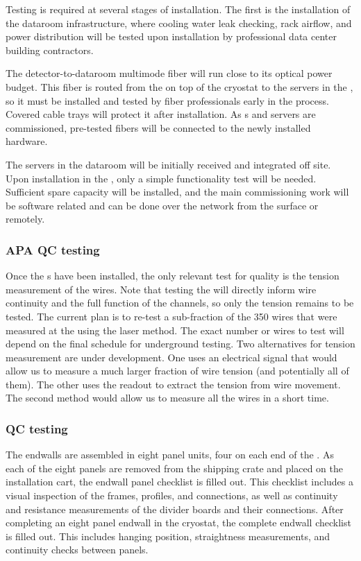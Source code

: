 Testing is required at several stages of  installation.  The first is the installation of the dataroom infrastructure, where cooling water leak checking, rack airflow, and power distribution will be tested upon installation by professional data center building contractors.

The detector-to-dataroom multimode fiber will run close to its optical power budget.  This fiber is routed from the  on top of the cryostat to the servers in the , so it must be installed and tested by fiber professionals early in the process.  Covered cable trays will protect it after installation.  As s and servers are commissioned, pre-tested fibers will be connected to the newly installed hardware.

The  servers in the  dataroom will be initially received and integrated off site.  Upon installation in the , only a simple functionality test will be needed.  Sufficient spare capacity will be installed, and the main commissioning work will be software related and can be done over the network from the surface or remotely.

\subsubsection{APA QC testing}

Once the s have been installed, the only relevant test for  quality is the tension measurement of the wires. 
Note that testing the  will directly inform wire continuity and the full function of the channels, so only the tension remains to be tested. 
The current plan is to re-test a sub-fraction of the 350 wires that were measured at the  using the laser method. 
The exact number or wires to test will depend on the final schedule for underground testing. 
Two alternatives for tension measurement are under development. 
One uses an electrical signal that would allow us to measure a much larger fraction of wire tension (and potentially all of them). 
The other uses the  readout to extract the tension from wire movement. 
The second method would allow us to measure all the wires in a short time.

\subsubsection{ QC testing}

The endwalls are assembled in eight panel units, four on each end of the .  
As each of the eight panels are removed from the shipping crate and placed on the installation cart, the endwall panel checklist is filled out.\cite{bib:docdb10452}
This checklist includes a visual inspection of the frames, profiles, and connections, as well as continuity and resistance measurements of the divider boards and their connections.  
After completing an eight panel endwall in the cryostat, the complete endwall checklist is filled out.  
This includes hanging position, straightness measurements, and continuity checks between panels.


